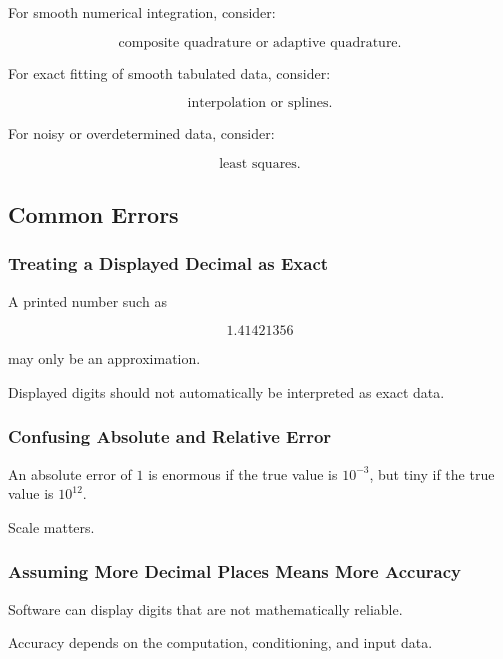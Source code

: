 For smooth numerical integration, consider:

\[
\boxed{
\text{composite quadrature or adaptive quadrature}.
}
\]

For exact fitting of smooth tabulated data, consider:

\[
\boxed{
\text{interpolation or splines}.
}
\]

For noisy or overdetermined data, consider:

\[
\boxed{
\text{least squares}.
}
\]

\subsection{Common Errors}
\label{subsec:numerical-analysis-common-errors}

\subsubsection{Treating a Displayed Decimal as Exact}

A printed number such as

\[
1.41421356
\]

may only be an approximation.

Displayed digits should not automatically be interpreted as exact data.

\subsubsection{Confusing Absolute and Relative Error}

An absolute error of \(1\) is enormous if the true value is \(10^{-3}\),
but tiny if the true value is \(10^{12}\).

Scale matters.

\subsubsection{Assuming More Decimal Places Means More Accuracy}

Software can display digits that are not mathematically reliable.

Accuracy depends on the computation, conditioning, and input data.

